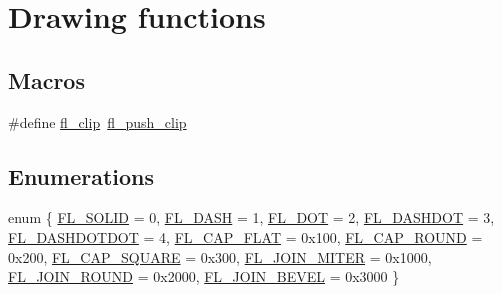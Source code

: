 \hypertarget{group__fl__drawings}{}\section{Drawing functions}
\label{group__fl__drawings}
\subsection*{Macros}
\begin{DoxyCompactItemize}
\item 
\#define \hyperlink{group__fl__drawings_ga0061bafa4252431de247713975e4c3ef}{fl\+\_\+clip}~\hyperlink{group__fl__drawings_gabe60242ba3b975800717b95cb6bc06d2}{fl\+\_\+push\+\_\+clip}
\end{DoxyCompactItemize}
\subsection*{Enumerations}
\begin{DoxyCompactItemize}
\item 
enum \{ \newline
\hyperlink{group__fl__drawings_ggabc6126af1d45847bc59afa0aa3216b04ac795ee9acc4107748784fe6bb3c32178}{F\+L\+\_\+\+S\+O\+L\+ID} = 0, 
\hyperlink{group__fl__drawings_ggabc6126af1d45847bc59afa0aa3216b04a09b9edc8f3a16264ec51b6be3b785346}{F\+L\+\_\+\+D\+A\+SH} = 1, 
\hyperlink{group__fl__drawings_ggabc6126af1d45847bc59afa0aa3216b04aa001e23c439f6872fd4d30ecdae78dd8}{F\+L\+\_\+\+D\+OT} = 2, 
\hyperlink{group__fl__drawings_ggabc6126af1d45847bc59afa0aa3216b04af03630c0376e6916d4af7114250808f7}{F\+L\+\_\+\+D\+A\+S\+H\+D\+OT} = 3, 
\newline
\hyperlink{group__fl__drawings_ggabc6126af1d45847bc59afa0aa3216b04ab5c566b53357b8aab0659306e41a71ce}{F\+L\+\_\+\+D\+A\+S\+H\+D\+O\+T\+D\+OT} = 4, 
\hyperlink{group__fl__drawings_ggabc6126af1d45847bc59afa0aa3216b04a106d3870d9d4043d5e1efea7be71df9b}{F\+L\+\_\+\+C\+A\+P\+\_\+\+F\+L\+AT} = 0x100, 
\hyperlink{group__fl__drawings_ggabc6126af1d45847bc59afa0aa3216b04af4f6315e1b6adcc28bc1cf28b227a77e}{F\+L\+\_\+\+C\+A\+P\+\_\+\+R\+O\+U\+ND} = 0x200, 
\hyperlink{group__fl__drawings_ggabc6126af1d45847bc59afa0aa3216b04a9ff5da2f996f81442f3148a70068806e}{F\+L\+\_\+\+C\+A\+P\+\_\+\+S\+Q\+U\+A\+RE} = 0x300, 
\newline
\hyperlink{group__fl__drawings_ggabc6126af1d45847bc59afa0aa3216b04a98b1abbce3a84336577ca2505a336483}{F\+L\+\_\+\+J\+O\+I\+N\+\_\+\+M\+I\+T\+ER} = 0x1000, 
\hyperlink{group__fl__drawings_ggabc6126af1d45847bc59afa0aa3216b04a3c60c1440df78b5a6e1f26cce69fa607}{F\+L\+\_\+\+J\+O\+I\+N\+\_\+\+R\+O\+U\+ND} = 0x2000, 
\hyperlink{group__fl__drawings_ggabc6126af1d45847bc59afa0aa3216b04a3eba95d41a50b905b68a56c0a059f98c}{F\+L\+\_\+\+J\+O\+I\+N\+\_\+\+B\+E\+V\+EL} = 0x3000
 \}
\end{DoxyCompactItemize}
